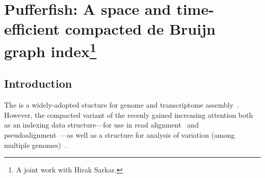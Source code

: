 \chapter{Pufferfish: A space and time-efficient compacted de Bruijn graph index\protect\footnote{A joint work with Hirak Sarkar.}}
\label{sec:pufferfish}


%
%
%
%
%

\section{Introduction}\label{sec:intro}

The \dbg is a widely-adopted stucture for genome and transcriptome
assembly~\cite{grabherr2011full,pevzner2001eulerian,haas2013novo}. However, the
compacted variant of the \dbg recenly gained increasing attention both as an indexing
data structure---for use in read alignment~\cite{liu2016debga} and
pseudoalignment~\cite{Bray2016Kallisto}---as well as a structure for analysis of
variation (among multiple genomes)~\cite{minkin2016twopaco}.


